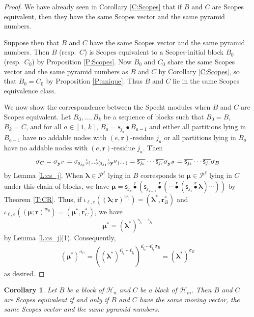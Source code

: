 \documentclass[11pt,a4paper,reqno]{amsart}
\numberwithin{equation}{section}
\theoremstyle{plain}
\newtheorem{cor}[thm]{Corollary}
\theoremstyle{definition}
\theoremstyle{remark}
\numberwithin{equation}{section}
\newcommand{\bl}{\boldsymbol{\lambda}}
\newcommand{\bm}{\boldsymbol{\mu}}
\newcommand{\br}{\mathbf{r}}
\newcommand{\by}{\mathbf{y}}
\newcommand{\cs}{\mathsf{s}}
\newcommand{\HH}{\mathcal{H}}
\newcommand{\PP}{\mathcal{P}}
\newcommand{\DDot}[1]{\mathrel{\overset{#1}{\bullet}}}
\newcommand{\CDot}[1]{\mathrel{\overset{#1}{\circ}}}
\newcommand{\bij}{\iota}
\begin{document}
\begin{proof}
  We have already seen in Corollary \ref{C:Scopes} that if $B$ and $C$ are Scopes equivalent, then they have the same Scopes vector and the same pyramid numbers.

  Suppose then that $B$ and $C$ have the same Scopes vector and the same pyramid numbers.
  Then $B$ (resp.\ $C$) is Scopes equivalent to a Scopes-initial block $B_0$ (resp.\ $C_0$) by Proposition \ref{P:Scopes}.
  Now $B_0$ and $C_0$ share the same Scopes vector and the same pyramid numbers as $B$ and $C$ by Corollary \ref{C:Scopes},
  so that $B_0 = C_0$ by Proposition \ref{P:unique}.
  Thus $B$ and $C$ lie in the same Scopes equivalence class.
  
  We now show the correspondence between the Specht modules when $B$ and $C$ are Scopes equivalent.
  Let $B_0, \dotsc, B_k$ be a sequence of blocks such that $B_0 = B$, $B_k = C$, and for all $a \in [1,\, k]$, $B_{a} = \cs_{j_a} \DDot{} B_{a-1}$ and either all partitions lying in $B_{a-1}$ have no addable nodes with $(e,\br)$-residue $j_a$ or all partitions lying in $B_{a}$ have no addable nodes with $(e,\br)$-residue $j_a$.
  Then 
  $$\sigma_C = \sigma_{\by^C} = \sigma_{\smash[t]{\cs_{j_k} \CDot{1} ( \dotsb \CDot{1} (\cs_{j_1} \CDot{1} \by^B) \dotsm )}}
  = \overline{\cs_{j_k}} \dotsm \overline{\cs_{j_1}}\sigma_{\by^B} = \overline{\cs_{j_k}} \dotsm \overline{\cs_{j_1}}\sigma_B
  $$  
  by Lemma \ref{L:cs_j}.
  When $\bl \in \PP^{\ell}$ lying in $B$ corresponds to $\bm \in \PP^{\ell}$ lying in $C$ under this chain of blocks, we have $\bm = \cs_{j_k} \DDot{r} (\cs_{j_{k-1}} \DDot{\br} (\dotsm \DDot{\br} (\cs_{j_1} \DDot{\br} \bl)\dotsm))$ by Theorem \ref{T:CR}. Thus, if $\bij_{\ell,e}((\bl;\br)^{w_0}) = (\bl^*, \br^*_B)$ and $\bij_{\ell,e}((\bm;\br)^{w_0}) = (\bm^*, \br^*_C)$, we have
  $$
  \bm^* = (\bl^*)^{\overline{\cs_{j_1}} \dotsm \overline{\cdot \cs_{j_k}}}$$
  by Lemma \ref{L:cs_j}(1).
  Consequently,
  \begin{align*}
  (\bm^*)^{\sigma_C} = ((\bl^*)^{\overline{\cs_{j_1}} \dotsm \overline{\cdot \cs_{j_k}}})^{\overline{\cs_{j_k}} \dotsm \overline{\cs_{j_1}}\sigma_B} = (\bl^*)^{\sigma_B}
  \end{align*}
  as desired.
  \end{proof}

\begin{cor} \label{C: }
Let $B$ be a block of $\HH_n$ and $C$ be a block of $\HH_m$.  Then $B$ and $C$ are Scopes equivalent if and only if $B$ and $C$ have the same moving vector, the same Scopes vector and the same pyramid numbers.  
\end{cor}
\end{document}
